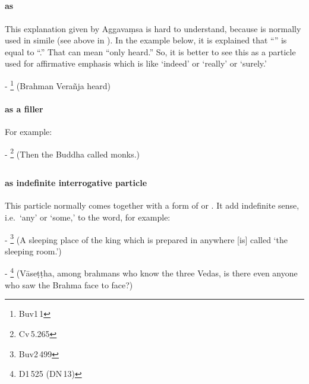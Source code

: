 \subsection*{}\label{nip:kho}
\paragraph*{ as } This explanation given by Aggava\d msa is hard to understand, because  is normally used in simile (see above in ). In the example below, it is explained that ``'' is equal to ``.'' That can mean ``only heard.'' So, it is better to see this as a particle used for affirmative emphasis which is like `indeed' or `really' or `surely.'\par
- \footnote{Buv1\,1} (Brahman Vera\~nja heard) \par
\paragraph*{ as a filler} For example:\par
- \footnote{Cv\,5.265} (Then the Buddha called monks.) \par

\subsection*{}\label{nip:ci}
\paragraph*{ as indefinite interrogative particle} This particle normally comes together with a form of  or . It add indefinite sense, i.e.\ `any' or `some,' to the word, for example:\par
- \footnote{Buv2\,499} (A sleeping place of the king which is prepared in anywhere [is] called `the sleeping room.') \par
- \footnote{D1\,525 (DN\,13)} (V\=ase\d t\d tha, among brahmans who know the three Vedas, is there even anyone who saw the Brahma face to face?) \par

